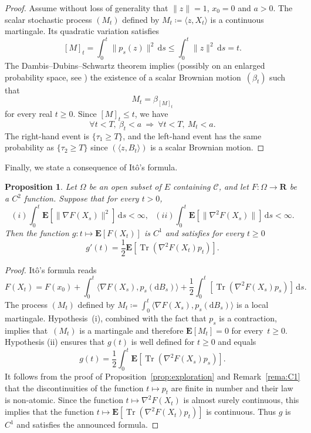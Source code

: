 \documentclass[10pt,a4paper]{amsart}
\newcommand{\R}{\mathbf{R}}
\newcommand{\E}{\mathbf{E}}
\newcommand{\iy}{\infty}
\DeclareMathOperator{\tr}{Tr}
\newcommand{\scalar}[2]{\langle #1 , #2\rangle}
\renewcommand{\leq}{\leqslant}
\renewcommand{\geq}{\geqslant}
\newtheorem{proposition}{Proposition}
\begin{document}
\begin{proof}
Assume without loss of generality that $\|z\|=1$, $x_0=0$ and $a>0$. The scalar stochastic process $(M_t)$ defined by $M_t \coloneqq \scalar{z}{X_t}$ is a continuous martingale. Its quadratic variation satisfies
\[ [M]_t = \int_0^t \|p_s(z)\|^2 \, \mathrm{d}s \leq
\int_0^t \|z\|^2 \, \mathrm{d}s = t .\]
The Dambis--Dubins--Schwartz theorem implies (possibly on an enlarged probability space, see \cite[Theorem 5.5]{LeGall13}) the existence of a scalar Brownian motion~$(\beta_t)$ such that
\[ M_{t} = \beta_{[M]_t}\]
for every real $t \geq 0$. Since $[M]_t \leq t$, we have
\[ \forall t < T,\ \beta_{t} < a \ \Longrightarrow \ \forall t < T, \  M_t < a . \]
The right-hand event is $\{\tau_1 \geq T\}$, and the left-hand event has the same probability as $\{\tau_2 \geq T\}$ since $(\scalar{z}{B_t})$ is a scalar Brownian motion.
\end{proof}
 
Finally, we state a consequence of It\^o's formula.
 

\begin{proposition} \label{prop:Ito}
Let $\Omega$ be an open subset of $E$ containing $\mathscr{C}$, and let $F \colon  \Omega \to \R$ be a $C^2$ function.
Suppose that for every $t>0$,
\[ (i) \int_0^t \E[ \|\nabla F(X_s)\|^2] \, \mathrm{d}s < \iy,
 \ \ \
 (ii) \int_0^t \E[ \|\nabla^2 F(X_s)\|] \, \mathrm{d}s < \iy.
\]
Then the function $g : t \mapsto \E [F(X_t)]$ is $C^1$ and satisfies for every $t \geq 0$
\[ g'(t) = \frac{1}{2} \E \left[ \tr
(\nabla^2F(X_t) p_t ) \right]. \]
\end{proposition}

\begin{proof}
It\^o's formula reads
\[ F(X_t) = F(x_0) + \int_0^t \scalar{\nabla F(X_s)}{p_s(\mathrm{d} B_s)} + \frac{1}{2} \int_0^t \left[ \tr (\nabla^2F(X_s) p_s )\right] \, \mathrm{d}s .\]
The process $(M_t)$ defined by $M_t \coloneqq \int_0^t \scalar{\nabla F(X_s)}{p_s(\mathrm{d} B_s)}$ is a local martingale. Hypothesis~(i), combined with the fact that $p_s$ is a contraction, implies that~$(M_t)$ is a martingale and therefore $\E[ M_t ] = 0$ for every~$t \geq 0$. Hypothesis (ii) ensures that $g(t)$ is well defined for $t \geq 0$ and equals
\[g(t) =  \frac{1}{2} \int_0^t \E \left[ \tr
(\nabla^2F(X_s) p_s ) \right]. \]
It follows from the proof of Proposition~\ref{prop:exploration} and Remark~\ref{rema:C1} that the discontinuities of the function $t \mapsto p_t$ are finite in number and their law is non-atomic. Since the function $t \mapsto \nabla^2 F (X_t)$ is almost surely continuous, this implies that the function $t \mapsto \E \left[ \tr
(\nabla^2F(X_t) p_t ) \right]$ is continuous. Thus $g$ is $C^1$ and satisfies the announced formula.
\end{proof}
\end{document}
